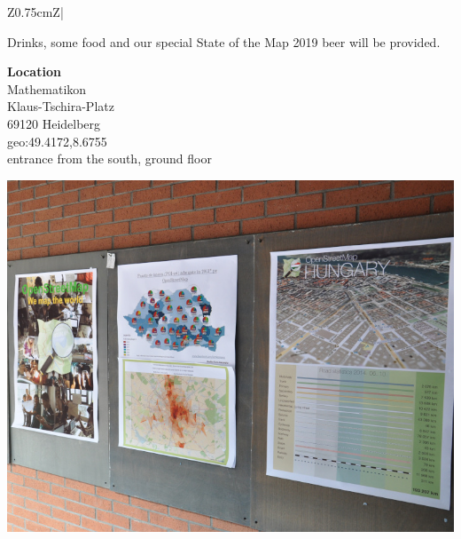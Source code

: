 \begin{landscape}
\begin{center}
\begin{tabular}{Z{0.75cm}Z{\socialEventBoxWidth}|}
\begin{minipage}[t]{\socialEventBoxWidth}
\begin{minipage}[c]{0.4\linewidth}
          Drinks, some food and our special State of the Map 2019 beer will be provided.

          \vspace{\socialEventSectionSep}
          \textbf{Location}\\
          Mathematikon\\
          Klaus-Tschira-Platz\\
          69120 Heidelberg\\
          geo:49.4172,8.6755\\
          entrance from the south, ground floor
          \justifying
        \end{minipage}
        \hfill
        \noindent\begin{minipage}[c]{0.57\linewidth}
          \begin{center}
            \includegraphics[width=0.9\linewidth]{images-print/posters-sotm-eu-2014.jpg}

          \end{center}
        \end{minipage}
      \end{minipage}
      \vspace{0.4\multicolsep}
      \tabularnewline
    \end{tabular}
  \end{center}
\end{landscape}
\renewcommand{\arraystretch}{1.0}
\normalsize
